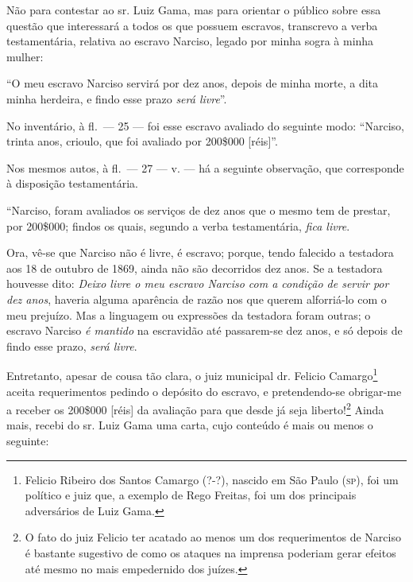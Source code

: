Não para contestar ao sr. Luiz Gama, mas para orientar o público sobre
essa questão que interessará a todos os que possuem escravos, transcrevo
a verba testamentária, relativa ao escravo Narciso, legado por minha
sogra à minha mulher:

``O meu escravo Narciso servirá por dez anos, depois de minha morte, a
dita minha herdeira, e findo esse prazo \emph{será livre}''.

No inventário, à fl.~--- 25 --- foi esse escravo avaliado do seguinte
modo: ``Narciso, trinta anos, crioulo, que foi avaliado por 200\$000
{[}réis{]}''.

Nos mesmos autos, à fl.~--- 27 --- v. --- há a seguinte observação, que
corresponde à disposição testamentária.

``Narciso, foram avaliados os serviços de dez anos que o mesmo tem de
prestar, por 200\$000; findos os quais, segundo a verba testamentária,
\emph{fica livre}.

Ora, vê-se que Narciso não é livre, é escravo; porque, tendo falecido a
testadora aos 18 de outubro de 1869, ainda não são decorridos dez anos.
Se a testadora houvesse dito: \emph{Deixo livre o meu escravo Narciso
com a condição de servir por dez anos}, haveria alguma aparência de
razão nos que querem alforriá-lo com o meu prejuízo. Mas a linguagem ou
expressões da testadora foram outras; o escravo Narciso \emph{é mantido}
na escravidão até passarem-se dez anos, e só depois de findo esse prazo,
\emph{será livre}.

Entretanto, apesar de cousa tão clara, o juiz municipal dr. Felicio
Camargo\footnote{ Felicio Ribeiro dos Santos Camargo (?-?), nascido
  em São Paulo (\textsc{sp}), foi um político e juiz que, a exemplo de Rego
  Freitas, foi um dos principais adversários de Luiz Gama.} aceita
requerimentos pedindo o depósito do escravo, e pretendendo-se obrigar-me
a receber os 200\$000 {[}réis{]} da avaliação para que desde já seja
liberto!\footnote{ O fato do juiz Felicio ter acatado ao menos um
  dos requerimentos de Narciso é bastante sugestivo de como os ataques
  na imprensa poderiam gerar efeitos até mesmo no mais empedernido dos
  juízes.} Ainda mais, recebi do sr. Luiz Gama uma carta, cujo conteúdo
é mais ou menos o seguinte:

